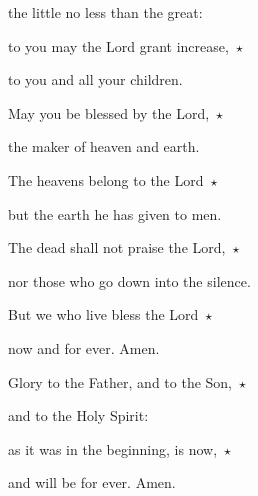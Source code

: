 the little no less than the great:

\noindent to you may the Lord grant increase,~$\star$~

to you and all your children.



\noindent May you be blessed by the Lord,~$\star$~

the maker of heaven and earth.

\noindent The heavens belong to the Lord~$\star$~

but the earth he has given to men.



\noindent The dead shall not praise the Lord,~$\star$~

nor those who go down into the silence.

\noindent But we who live bless the Lord~$\star$~

now and for ever. Amen.



\noindent Glory to the Father, and to the Son,~$\star$~

and to the Holy Spirit:

\noindent as it was in the beginning, is now,~$\star$~

and will be for ever. Amen.
